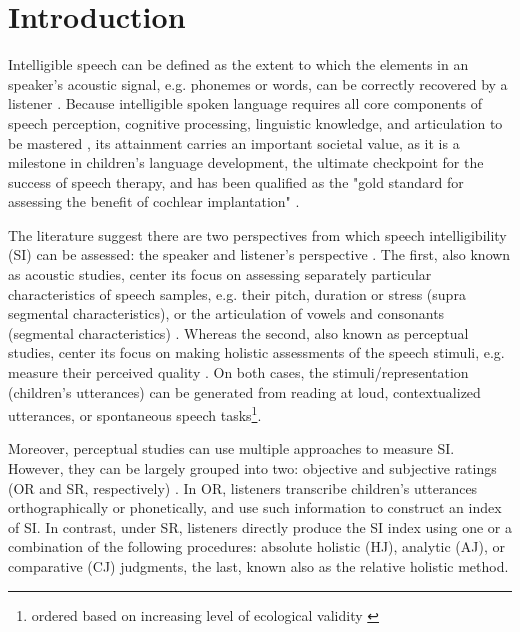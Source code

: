 \section{Introduction}

Intelligible speech can be defined as the extent to which the elements in an speaker's acoustic signal, e.g. phonemes or words, can be correctly recovered by a listener \citep{Kent_et_al_1989, Whitehill_et_al_2004, vanHeuven_2008, Freeman_et_al_2017}. Because intelligible spoken language requires all core components of speech perception, cognitive processing, linguistic knowledge, and articulation to be mastered \citep{Freeman_et_al_2017}, its attainment carries an important societal value, as it is a milestone in children's language development, the ultimate checkpoint for the success of speech therapy, and has been qualified as the "gold standard for assessing the benefit of cochlear implantation" \citep{Chin_et_al_2012}. 

The literature suggest there are two perspectives from which speech intelligibility (SI) can be assessed: the speaker and listener's perspective \citep{Boonen_et_al_2020, Boonen_et_al_2021}. The first, also known as acoustic studies, center its focus on assessing separately particular characteristics of speech samples, e.g. their pitch, duration or stress (supra segmental characteristics), or the articulation of vowels and consonants (segmental characteristics) \citep{Rowe_et_al_2018}. Whereas the second, also known as perceptual studies, center its focus on making holistic assessments of the speech stimuli, e.g. measure their perceived quality \citep{Boonen_et_al_2020, Boonen_et_al_2021}. On both cases, the stimuli/representation (children's utterances) can be generated from reading at loud, contextualized utterances, or spontaneous speech tasks\footnote{ordered based on increasing level of ecological validity \citep{Flipsen_2006,Ertmer_2011}}.

\begin{comment}
Based on their description, it seems that that perceptual studies are more subjective than acoustic studies, as they do not rely on "objective" measurements, i.e. time duration, wave amplitude, among others, available in the former. However, for the case of SI, there are objective and subjective assessment methodologies.
\end{comment}

Moreover, perceptual studies can use multiple approaches to measure SI. However, they can be largely grouped into two: objective and subjective ratings (OR and SR, respectively) \citep{Hustad_et_al_2020}. In OR, listeners transcribe children's utterances orthographically or phonetically, and use such information to construct an index of SI. In contrast, under SR, listeners directly produce the SI index using one or a combination of the following procedures: absolute holistic (HJ), analytic (AJ), or comparative (CJ) judgments, the last, known also as the relative holistic method. 

